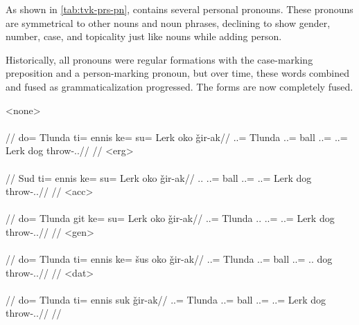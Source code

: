 As shown in \autoref{tab:tvk-prs-pn}, \langtvk{} contains several personal pronouns. These pronouns are symmetrical to other nouns and noun phrases\autocite{wals-50}, declining to show gender, number, case, and topicality just like nouns while adding person.

Historically, all pronouns were regular formations with the case-marking preposition and a person-marking pronoun, but over time, these words combined and fused as grammaticalization progressed. The forms are now completely fused.

	\a<none>\begingl
		\glpreamble{}\\
		\\
		//
		\gla do= Tlunda ti= ennis ke= su= Lerk oko ǧir-ak//
		\glb \An.\Sg.\Erg= Tlunda \In.\Sg.\Acc= ball \An.\Sg.\Dat= \An.\Sg.\Gen= Lerk dog throw-\Ind.\Pst.\Pfv//
		\glft{}//
	\endgl
	\a<erg>\begingl
		\glpreamble{}\\
		\\
		//
		\gla Sud ti= ennis ke= su= Lerk oko ǧir-ak//
		\glb \Tps.\An.\Erg{} \In.\Sg.\Acc= ball \An.\Sg.\Dat= \An.\Sg.\Gen= Lerk dog throw-\Ind.\Pst.\Pfv//
		\glft{}//
	\endgl
	\a<acc>\begingl
		\glpreamble{}\\
		\\
		//
		\gla do= Tlunda git ke= su= Lerk oko ǧir-ak//
		\glb \An.\Sg.\Erg= Tlunda \Tps.\In.\Acc{} \An.\Sg.\Dat= \An.\Sg.\Gen= Lerk dog throw-\Ind.\Pst.\Pfv//
		\glft{}//
	\endgl
	\a<gen>\begingl
		\glpreamble{}\\
		\\
		//
		\gla do= Tlunda ti= ennis ke= šus oko ǧir-ak//
		\glb \An.\Sg.\Erg= Tlunda \In.\Sg.\Acc= ball \An.\Sg.\Dat= \Tps.\An.\Gen{} dog throw-\Ind.\Pst.\Pfv//
		\glft{}//
	\endgl
	\a<dat>\begingl
		\glpreamble{}\\
		\\
		//
		\gla do= Tlunda ti= ennis suk ǧir-ak//
		\glb \An.\Sg.\Erg= Tlunda \In.\Sg.\Acc= ball \An.\Sg.\Dat= \An.\Sg.\Gen= Lerk dog throw-\Ind.\Pst.\Pfv//
		\glft{}//
	\endgl
\xe

